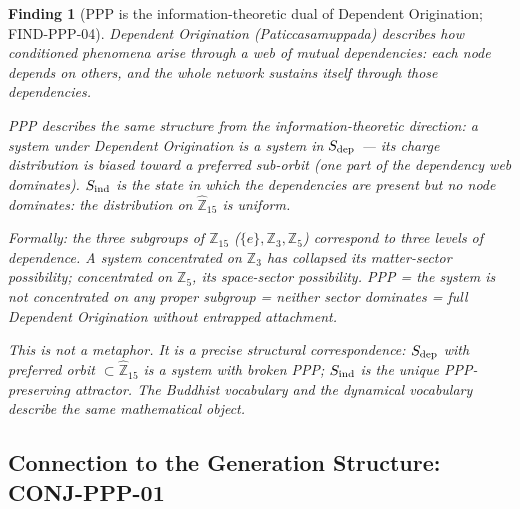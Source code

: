 \documentclass[12pt, a4paper]{article}
\newtheorem{finding}{Finding}[section]
\begin{document}
\begin{finding}[PPP is the information-theoretic dual of
  Dependent Origination; FIND-PPP-04]
\label{find:DO}
Dependent Origination (Paticcasamuppada) describes how conditioned
phenomena arise through a web of mutual dependencies: each node
depends on others, and the whole network sustains itself through
those dependencies.

PPP describes the same structure from the \emph{information-theoretic}
direction: a system under Dependent Origination is a system in
$S_{\rm dep}$ --- its charge distribution is biased toward a
preferred sub-orbit (one part of the dependency web dominates).
$S_{\rm ind}$ is the state in which the dependencies are present
but no node dominates: the distribution on $\hat{\mathbb{Z}}_{15}$
is uniform.

Formally: the three subgroups of $\mathbb{Z}_{15}$
($\{e\}, \mathbb{Z}_3, \mathbb{Z}_5$) correspond to three levels
of dependence. A system concentrated on $\mathbb{Z}_3$ has
collapsed its matter-sector possibility; concentrated on
$\mathbb{Z}_5$, its space-sector possibility. PPP = the system
is not concentrated on any proper subgroup = neither sector
dominates = full Dependent Origination without entrapped attachment.

This is not a metaphor. It is a precise structural correspondence:
$S_{\rm dep}$ with preferred orbit $\subset \hat{\mathbb{Z}}_{15}$
is a system with broken PPP; $S_{\rm ind}$ is the unique PPP-preserving
attractor. The Buddhist vocabulary and the dynamical vocabulary
describe the same mathematical object.
\end{finding}

\subsection{Connection to the Generation Structure: CONJ-PPP-01}
\label{sec:generations}
\end{document}
